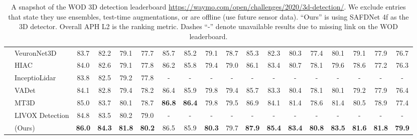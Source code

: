 \begin{table}[]
\begin{tabular}{@{}llcccccccccccccccc@{}}
    & VeuronNet3D                                    & 83.7 & 82.2 & 79.1 & 77.7 & 85.7 & 85.2 & 79.1 & 78.7 & 85.3 & 82.3 & 80.3 & 77.4 & 80.1 & 79.1 & 77.9 & 76.7 \\
    & HIAC                                           & 84.0 & 82.6 & 79.1 & 77.8 & 86.2 & 85.8 & 79.4 & 79.0 & 86.1 & 83.4 & 80.7 & 78.1 & 79.6 & 78.6 & 77.2 & 76.3 \\
    & InceptioLidar                                  & 83.8 & 82.5 & 79.2 & 77.8 & - & - & - & - & - & - & - & - & - & - & - & -  \\
    & VADet                                          & 84.1 & 82.8 & 79.4 & 78.2 & 86.4 & 85.9 & 79.8 & 79.4 & 85.7 & 83.3 & 80.4 & 78.1 & 80.1 & 79.2 & 77.9 & 76.4 \\
    & MT3D                                           & 85.0 & 83.7 & 80.1 & 78.7 & \textbf{86.8} & \textbf{86.4} & 79.8 & 79.5 & 86.9 & 84.1 & 81.4 & 78.6 & 81.4 & 80.5 & 78.9 & 77.4 \\
    & LIVOX Detection                                & 84.8 & 83.5 & 80.2 & 79.0 & - & - & - & - & - & - & - & - & - & - & - & -  \\
    \rowcolor{tablecolor}
    & \ourmodel{} (Ours)                             & \textbf{86.0} & \textbf{84.3} & \textbf{81.8} & \textbf{80.2} & 86.5 & 85.9  & \textbf{80.3}  & 79.7 & \textbf{87.9} & \textbf{85.4} & \textbf{83.4} & \textbf{80.8} & \textbf{83.5} & \textbf{81.6} & \textbf{81.8} & \textbf{79.9} \\ \bottomrule
    \end{tabular}
    \caption{A snapshot of the WOD 3D detection leaderboard \href{https://waymo.com/open/challenges/2020/3d-detection/}{https://waymo.com/open/challenges/2020/3d-detection/}.
    We exclude entries that state they use ensembles, test-time augmentations, or are offline (use future sensor data).
    ``Ours'' is using SAFDNet 4f as the 3D detector. Overall APH L2 is the ranking metric.
    Dashes ``-'' denote unavailable results due to missing link on the WOD leaderboard.
    }
    \label{tab:full-leaderboard-all-classes}
\end{table}
